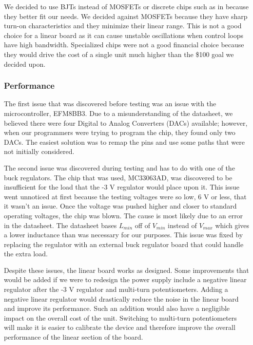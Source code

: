 \documentclass[15pt]{article}
\begin{document}
We decided to use BJTs instead of MOSFETs or discrete chips such as in \cite{adexpense}because they better fit our needs. We decided against MOSFETs because they have sharp turn-on characteristics and they minimize their linear range. This is not a good choice for a linear board as it can cause unstable oscillations when control loops have high bandwidth. Specialized chips were not a good financial choice because they would drive the cost of a single unit much higher than the \$100 goal we decided upon. 

\subsubsection{Performance}
The first issue that was discovered before testing was an issue with the microcontroller, EFM8BB3. Due to a misunderstanding of the datasheet, we believed there were four Digital to Analog Converters (DACs) available; however, when our programmers were trying to program the chip, they found only two DACs. The easiest solution was to remap the pins and use some paths that were not initially considered.
    
The second issue was discovered during testing and has to do with one of the buck regulators. The chip that was used, MC33063AD, was discovered to be insufficient for the load that the -3 V regulator would place upon it. This issue went unnoticed at first because the testing voltages were so low, 6 V or less, that it wasn’t an issue. Once the voltage was pushed higher and closer to standard operating voltages, the chip was blown. The cause is most likely due to an error in the datasheet. The datasheet bases $L_{min}$ off of $V_{min}$ instead of $V_{max}$ which gives a lower inductance than was necessary for our purposes. This issue was fixed by replacing the regulator with an external buck regulator board that could handle the extra load.

Despite these issues, the linear board works as designed. Some improvements that would be added if we were to redesign the power supply include a negative linear regulator after the -3 V regulator and multi-turn potentiometers. Adding a negative linear regulator would drastically reduce the noise in the linear board and improve its performance. Such an addition would also have a negligible impact on the overall cost of the unit. Switching to multi-turn potentiometers will make it is easier to calibrate the device and therefore improve the overall performance of the linear section of the board.
\end{document}

